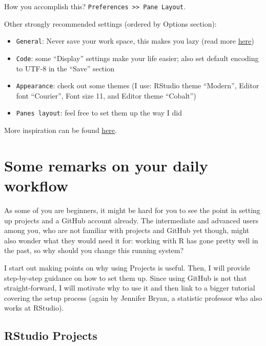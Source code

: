 \documentclass[
]{book}
\providecommand{\tightlist}{%
  \setlength{\itemsep}{0pt}\setlength{\parskip}{0pt}}
\begin{document}
How you accomplish this? \texttt{Preferences\ \textgreater{}\textgreater{}\ Pane\ Layout}.

Other strongly recommended settings (ordered by Options section):

\begin{itemize}
\tightlist
\item
  \texttt{General}: Never save your work space, this makes you lazy (read more \href{https://rstats.wtf/save-source.html}{here})
\item
  \texttt{Code}: some ``Display'' settings make your life easier; also set default encoding to UTF-8 in the ``Save'' section\\
\item
  \texttt{Appearance}: check out some themes (I use: RStudio theme ``Modern'', Editor font ``Courier'', Font size 11, and Editor theme ``Cobalt'')
\item
  \texttt{Panes\ layout}: feel free to set them up the way I did
\end{itemize}

More inspiration can be found \href{https://drdoane.com/my-rstudio-configuration/}{here}.

\hypertarget{some-remarks-on-your-daily-workflow}{%
\section{Some remarks on your daily workflow}\label{some-remarks-on-your-daily-workflow}}

As some of you are beginners, it might be hard for you to see the point in setting up projects and a GitHub account already. The intermediate and advanced users among you, who are not familiar with projects and GitHub yet though, might also wonder what they would need it for: working with R has gone pretty well in the past, so why should you change this running system?

I start out making points on why using Projects is useful. Then, I will provide step-by-step guidance on how to set them up. Since using GitHub is not that straight-forward, I will motivate why to use it and then link to a bigger tutorial covering the setup process (again by Jennifer Bryan, a statistic professor who also works at RStudio).

\hypertarget{rstudio-projects}{%
\subsection{RStudio Projects}\label{rstudio-projects}}
\end{document}
